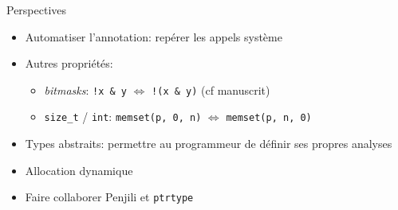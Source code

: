 \begin{frame}{Perspectives}
    \begin{itemize}
        \item Automatiser l'annotation: repérer les appels système
        \item Autres propriétés:
            \begin{itemize}
                \item \emph{bitmasks}: \texttt{!x \& y} $⇔$ \texttt{!(x \& y)}
                    (cf manuscrit)
                \item \texttt{size\_t} / \texttt{int}: \texttt{memset(p, 0, n)} $⇔$ \texttt{memset(p, n, 0)}
            \end{itemize}
        \item Types abstraits: permettre au programmeur de définir ses propres
            analyses
        \item Allocation dynamique
        \item Faire collaborer Penjili et \texttt{ptrtype}
        \end{itemize}
\end{frame}
